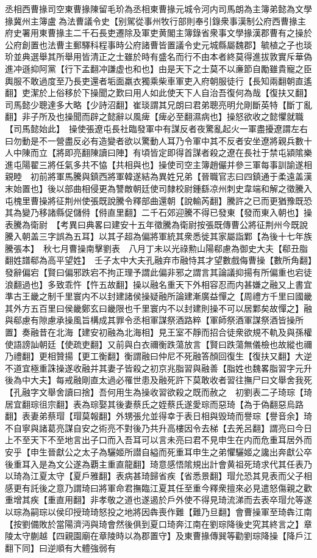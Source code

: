 丞相西曹掾司空東曹掾陳留毛玠為丞相東曹掾元城令河内司馬朗為主簿弟懿為文學掾冀州主簿盧為法曹議令史【别駕從事州牧行部則奉引錄衆事漢制公府西曹掾主府史署用東曹掾主二千石長吏遷除及軍吏黄閣主簿錄省衆事文學掾漢郡曹有之操於公府創置也法曹主郵驛科程事時公府諸曹皆置議令史元城縣屬魏郡】毓植之子也琰玠並典選舉其所舉用皆清正之士雖於時有盛名而行不由本者終莫得進拔敦實斥華偽進冲遜抑阿黨【行下孟翻冲謙虚也和也】由是天下之士莫不以亷節自勵雖貴寵之臣輿服不敢過度至乃長吏還者垢面羸衣獨乘柴車軍吏入府朝服徒行【長知兩翻朝直遙翻】吏潔於上俗移於下操聞之歎曰用人如此使天下人自治吾復何為哉【復扶又翻】司馬懿少聰達多大略【少詩沼翻】崔琰謂其兄朗曰君弟聰亮明允剛斷英特【斷丁亂翻】非子所及也操聞而辟之懿辭以風痺【痺必至翻濕病也】操怒欲收之懿懼就職【司馬懿始此】　操使張遼屯長社臨發軍中有謀反者夜驚亂起火一軍盡擾遼謂左右曰勿動是不一營盡反必有造變者欲以驚動人耳乃令軍中其不反者安坐遼將親兵數十人中陳而立【將即亮翻陳讀曰陣】有頃皆定即得首謀者殺之遼在長社于禁屯潁隂樂進屯陽翟三將任氣多共不恊【共相與也】操使司空主簿趙儼并參三軍每事訓諭遂相親睦　初前將軍馬騰與鎮西將軍韓遂結為異姓兄弟【晉職官志曰四鎮通于柔遠盖漢末始置也】後以部曲相侵更為讐敵朝廷使司隸校尉鍾繇凉州刺史韋端和解之徵騰入屯槐里曹操將征荆州使張既說騰令釋部曲還朝【說輸芮翻】騰許之已而更猶豫既恐其為變乃移諸縣促儲偫【偫直里翻】二千石郊迎騰不得已發東【發而東入朝也】操表騰為衛尉　【考異曰典畧曰建安十五年徵騰為衛尉按張既傳曹公將征荆州今既說騰入朝盖三字誤為五耳】以其子超為偏將軍統其衆悉徙其家屬詣鄴【為後十七年族騰張本】　秋七月曹操南擊劉表　八月丁未以光祿勲山陽郗慮為御史大夫【郗丑脂翻姓譜郗為高平望姓】　壬子太中大夫孔融弃市融恃其才望數戲侮曹操【數所角翻】發辭偏宕【賢曰偏邪跌宕不拘正理予謂此偏非邪之謂言其論議抑揚有所偏重也宕徒浪翻過也】多致乖忤【忤五故翻】操以融名重天下外相容忍而内甚嫌之融又上書宜準古王畿之制千里寰内不以封建諸侯操疑融所論建漸廣益憚之【周禮方千里曰國畿其外方五百里曰侯畿鄭玄曰畿限也千里寰内不以封建則操不可以居鄴矣故憚之】融與郗慮有隙慮承操風旨構成其罪令丞相軍謀祭酒路粹【軍師祭酒軍謀祭酒皆操所置】奏融昔在北海【建安初融為北海相】見王室不靜而招合徒衆欲規不軌及與孫權使語謗訕朝廷【使疏吏翻】又前與白衣禰衡跌蕩放言【賢曰跌蕩無儀檢也故縱也禰乃禮翻】更相贊揚【更工衡翻】衡謂融曰仲尼不死融答顏回復生【復扶又翻】大逆不道宜極重誅操遂收融并其妻子皆殺之初京兆脂習與融善【脂姓也魏畧脂習字元升後為中大夫】每戒融剛直太過必罹世患及融死許下莫敢收者習往撫尸曰文舉舍我死【孔融字文舉舍讀曰捨】吾何用生為操收習欲殺之既而赦之　初劉表二子琦琮【琦居宜翻琮徂宗翻】表為琮娶其後妻蔡氏之姪蔡氏遂愛琮而惡琦【為于偽翻惡烏路翻】表妻弟蔡瑁【瑁莫報翻】外甥張允並得幸于表日相與毁琦而譽琮【譽音余】琦不自寧與諸葛亮謀自安之術亮不對後乃共升高樓因令去梯【去羌呂翻】謂亮曰今日上不至天下不至地言出子口而入吾耳可以言未亮曰君不見申生在内而危重耳居外而安乎【申生晉獻公之太子為驪姬所譛自縊而死重耳申生之弟懼驪姬之讒出奔獻公卒後重耳入是為文公遂為覇主重直龍翻】琦意感悟隂規出計會黄祖死琦求代其任表乃以琦為江夏太守【夏戶雅翻】表病甚琦歸省疾【省悉景翻】瑁允恐其見表而父子相感更有託後之意乃謂琦曰將軍命君撫臨江夏其任至重今釋衆擅來必見遣怒傷親之歡重增其疾【重直用翻】非孝敬之道也遂遏於戶外使不得見琦流涕而去表卒瑁允等遂以琮為嗣琮以侯印授琦琦怒投之地將因犇喪作難【難乃旦翻】會曹操軍至琦犇江南【按劉備敗於當陽濟沔與琦會然後俱到夏口琦奔江南在劉琮降後史究其終言之】章陵太守蒯越【四親園廟在章陵時以為郡置守】及東曹掾傳巽等勸劉琮降操【降戶江翻下同】曰逆順有大體強弱有